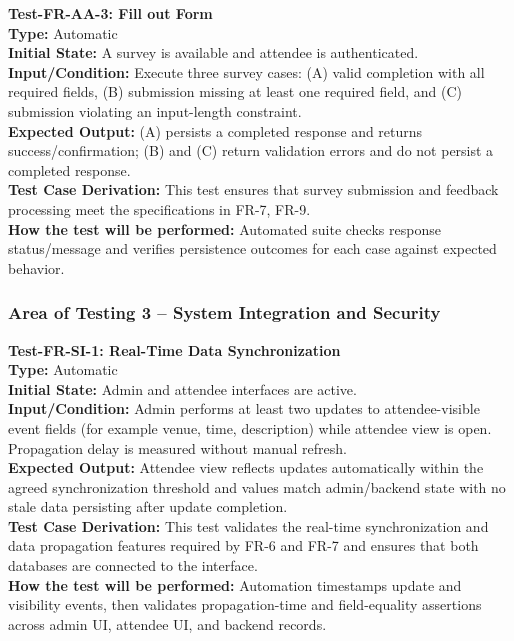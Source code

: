 \documentclass[12pt, titlepage]{article}
\begin{document}
\noindent\textbf{Test-FR-AA-3: Fill out Form}\\
\textbf{Type:} Automatic\\
\textbf{Initial State:} A survey is available and attendee is authenticated.\\
\textbf{Input/Condition:} Execute three survey cases: (A) valid completion with all required fields, (B) submission missing at least one required field, and (C) submission violating an input-length constraint.\\
\textbf{Expected Output:} (A) persists a completed response and returns success/confirmation; (B) and (C) return validation errors and do not persist a completed response.\\
\textbf{Test Case Derivation:} This test ensures that survey submission and feedback processing meet the specifications in FR-7, FR-9.\\
\textbf{How the test will be performed:} Automated suite checks response status/message and verifies persistence outcomes for each case against expected behavior.\\[12pt]

\subsubsection{Area of Testing 3 – System Integration and Security}

\noindent\textbf{Test-FR-SI-1: Real-Time Data Synchronization}\\
\textbf{Type:} Automatic\\
\textbf{Initial State:} Admin and attendee interfaces are active.\\
\textbf{Input/Condition:} Admin performs at least two updates to attendee-visible event fields (for example venue, time, description) while attendee view is open. Propagation delay is measured without manual refresh.\\
\textbf{Expected Output:} Attendee view reflects updates automatically within the agreed synchronization threshold and values match admin/backend state with no stale data persisting after update completion.\\
\textbf{Test Case Derivation:} This test validates the real-time synchronization and data propagation features required by FR-6 and FR-7 and ensures that both databases are connected to the interface.\\
\textbf{How the test will be performed:} Automation timestamps update and visibility events, then validates propagation-time and field-equality assertions across admin UI, attendee UI, and backend records.\\[6pt]
\end{document}
